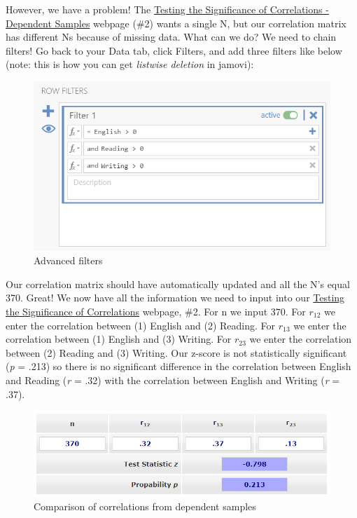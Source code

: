 \documentclass[
]{book}
\begin{document}
However, we have a problem! The \href{https://www.psychometrica.de/correlation.html\#dependent}{Testing the Significance of Correlations - Dependent Samples} webpage (\#2) wants a single N, but our correlation matrix has different Ns because of missing data. What can we do? We need to chain filters! Go back to your Data tab, click Filters, and add three filters like below (note: this is how you can get \emph{listwise deletion} in jamovi):

\begin{figure}

{\centering \includegraphics[width=1\linewidth]{images/08-correlation/correlation-filters} 

}

\caption{Advanced filters}\label{fig:unnamed-chunk-4}
\end{figure}

Our correlation matrix should have automatically updated and all the N's equal 370. Great! We now have all the information we need to input into our \href{https://www.psychometrica.de/correlation.html}{Testing the Significance of Correlations} webpage, \#2. For n we input 370. For \(r_{12}\) we enter the correlation between (1) English and (2) Reading. For \(r_{13}\) we enter the correlation between (1) English and (3) Writing. For \(r_{23}\) we enter the correlation between (2) Reading and (3) Writing. Our z-score is not statistically significant (\emph{p} = .213) so there is no significant difference in the correlation between English and Reading (\emph{r} = .32) with the correlation between English and Writing (\emph{r} = .37).

\begin{figure}

{\centering \includegraphics[width=1\linewidth]{images/08-correlation/compare-correlations-dependent} 

}

\caption{Comparison of correlations from dependent samples}\label{fig:unnamed-chunk-5}
\end{figure}
\end{document}
